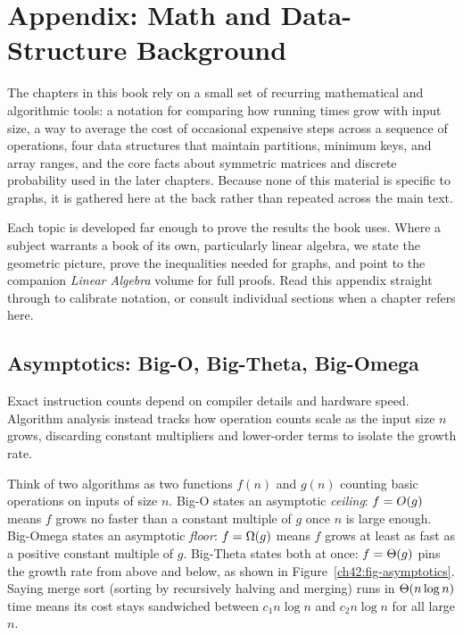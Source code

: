 \chapter{Appendix: Math and Data-Structure Background}
\label{ch:appendix}

\providecommand{\lowbit}{\operatorname{lowbit}}
\newcommand{\E}{\operatorname{\mathbb{E}}}
\newcommand{\Var}{\operatorname{Var}}
\renewcommand{\Pr}{\operatorname{\mathbb{P}}}
\providecommand{\diag}{}\renewcommand{\diag}{\operatorname{diag}}
\providecommand{\tr}{}\renewcommand{\tr}{\operatorname{tr}}
\newcommand{\amort}{\widehat{c}}
\newcommand{\find}{\textsc{Find}}
\newcommand{\union}{\textsc{Union}}

The chapters in this book rely on a small set of recurring mathematical and algorithmic tools: a notation for comparing how running times grow with input size, a way to average the cost of occasional expensive steps across a sequence of operations, four data structures that maintain partitions, minimum keys, and array ranges, and the core facts about symmetric matrices and discrete probability used in the later chapters. Because none of this material is specific to graphs, it is gathered here at the back rather than repeated across the main text.

Each topic is developed far enough to prove the results the book uses. Where a subject warrants a book of its own, particularly linear algebra, we state the geometric picture, prove the inequalities needed for graphs, and point to the companion \emph{Linear Algebra} volume for full proofs. Read this appendix straight through to calibrate notation, or consult individual sections when a chapter refers here.

\chapterline

\section{Asymptotics: Big-O, Big-Theta, Big-Omega}
\label{ch42:asymptotics}

Exact instruction counts depend on compiler details and hardware speed. Algorithm analysis instead tracks how operation counts scale as the input size $n$ grows, discarding constant multipliers and lower-order terms to isolate the growth rate.

\begin{intuitionbox}
Think of two algorithms as two functions $f(n)$ and $g(n)$ counting basic operations on inputs of size $n$. Big-O states an asymptotic \emph{ceiling}: $f = O(g)$ means $f$ grows no faster than a constant multiple of $g$ once $n$ is large enough. Big-Omega states an asymptotic \emph{floor}: $f = \Omega(g)$ means $f$ grows at least as fast as a positive constant multiple of $g$. Big-Theta states both at once: $f = \Theta(g)$ pins the growth rate from above and below, as shown in Figure~\ref{ch42:fig-asymptotics}. Saying merge sort (sorting by recursively halving and merging) runs in $\Theta(n\log n)$ time means its cost stays sandwiched between $c_1 n\log n$ and $c_2 n\log n$ for all large $n$.
\end{intuitionbox}


